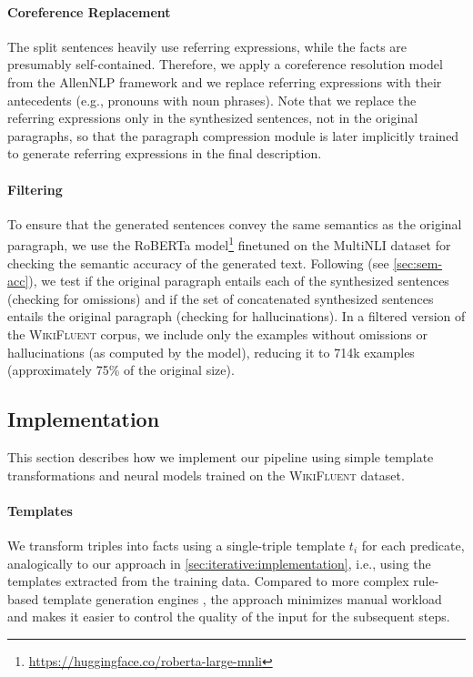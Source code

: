 \paragraph{Coreference Replacement} The split sentences heavily use referring expressions, while the facts are presumably self-contained. Therefore, we apply a coreference resolution model \cite{Lee2018HigherorderCR} from the AllenNLP framework \cite{gardner2018allennlp} and we replace referring expressions with their antecedents (e.g., pronouns with noun phrases). Note that we replace the referring expressions only in the synthesized sentences, not in the original paragraphs, so that the paragraph compression module is later implicitly trained to generate referring expressions in the final description.

\paragraph{Filtering} To ensure that the generated sentences convey the same semantics as the original paragraph, we use the RoBERTa model\footnote{\url{https://huggingface.co/roberta-large-mnli}} \cite{liuRoBERTaRobustlyOptimized2019} finetuned on the MultiNLI dataset \cite{williams2018mnli} for checking the semantic accuracy of the generated text. Following \citet{dusekEvaluatingSemanticAccuracy2020} (see \autoref{sec:sem-acc}), we test if the original paragraph entails each of the synthesized sentences (checking for omissions) and if the set of concatenated synthesized sentences entails the original paragraph (checking for hallucinations). In a filtered version of the \textsc{WikiFluent} corpus, we include only the examples without omissions or hallucinations (as computed by the model), reducing it to 714k examples (approximately 75\% of the original size).

\subsection{Implementation}
\label{sec:pipeline:implementation}

This section describes how we implement our pipeline using simple template transformations and neural models trained on the \textsc{WikiFluent} dataset.

\paragraph{Templates}
We transform triples into facts using a single-triple template $t_i$ for each predicate, analogically to our approach in \autoref{sec:iterative:implementation}, i.e., using the templates extracted from the training data. Compared to more complex rule-based template generation engines \cite{laha2020scalable,heidari2021getting,mehta2021improving}, the approach minimizes manual workload and makes it easier to control the quality of the input for the subsequent steps.

